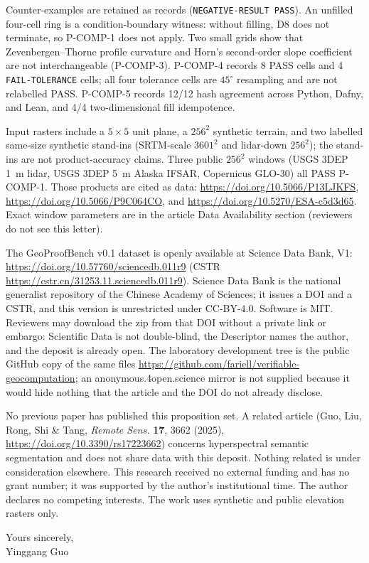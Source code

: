 \documentclass[11pt,a4paper]{article}
\begin{document}
Counter-examples are retained as records (\texttt{NEGATIVE-RESULT PASS}).
An unfilled four-cell ring is a condition-boundary witness:
without filling, D8 does not terminate, so P-COMP-1 does not apply.
Two small grids show that Zevenbergen--Thorne profile curvature and Horn's
second-order slope coefficient are not interchangeable
(P-COMP-3).
P-COMP-4 records 8 PASS cells and 4 \texttt{FAIL-TOLERANCE} cells;
all four tolerance cells are $45^{\circ}$ resampling and are not relabelled PASS.
P-COMP-5 records 12/12 hash agreement across Python, Dafny, and Lean,
and 4/4 two-dimensional fill idempotence.

Input rasters include a $5\times5$ unit plane, a $256^{2}$ synthetic terrain,
and two labelled same-size synthetic stand-ins
(SRTM-scale $3601^{2}$ and lidar-down $256^{2}$);
the stand-ins are not product-accuracy claims.
Three public $256^{2}$ windows (USGS 3DEP 1~m lidar, USGS 3DEP 5~m Alaska IFSAR,
Copernicus GLO-30) all PASS P-COMP-1.
Those products are cited as data:
\url{https://doi.org/10.5066/P13LJKFS},
\url{https://doi.org/10.5066/P9C064CO},
and \url{https://doi.org/10.5270/ESA-c5d3d65}.
Exact window parameters are in the article Data Availability section
(reviewers do not see this letter).

The GeoProofBench v0.1 dataset is openly available at Science Data Bank, V1:
\url{https://doi.org/10.57760/sciencedb.011r9}
(CSTR \url{https://cstr.cn/31253.11.sciencedb.011r9}).
Science Data Bank is the national generalist repository of the Chinese Academy
of Sciences; it issues a DOI and a CSTR, and this version is unrestricted
under CC-BY-4.0. Software is MIT.
Reviewers may download the zip from that DOI without a private link or
embargo: Scientific Data is not double-blind, the Descriptor names the
author, and the deposit is already open. The laboratory development tree is
the public GitHub copy of the same files
\url{https://github.com/fariell/verifiable-geocomputation};
an anonymous.4open.science mirror is not supplied because it would hide
nothing that the article and the DOI do not already disclose.

No previous paper has published this proposition set.
A related article (Guo, Liu, Rong, Shi \& Tang,
\textit{Remote Sens.} \textbf{17}, 3662 (2025),
\url{https://doi.org/10.3390/rs17223662})
concerns hyperspectral semantic segmentation and does not share data with this deposit.
Nothing related is under consideration elsewhere.
This research received no external funding and has no grant number;
it was supported by the author's institutional time.
The author declares no competing interests.
The work uses synthetic and public elevation rasters only.

\vspace{1.0em}
\noindent
Yours sincerely,\\[0.7em]
Yinggang Guo
\end{document}
